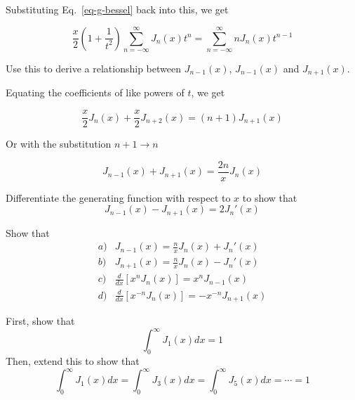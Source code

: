 Substituting Eq.~\ref{eq-g-bessel} back into this, we get

\begin{equation}
\frac{x}{2}\left({1 + \frac{1}{t^2}}\right) \sum_{n = - \infty}^{\infty} J_n(x)t^n = \sum_{n = - \infty}^{\infty} n J_n(x)t^{n-1}
\end{equation}

\begin{cue}
Use this to derive a relationship between $J_{n-1}(x)$, $J_{n-1}(x)$ and  $J_{n+1}(x)$. 
\end{cue}

\noindent{}Equating the coefficients of like powers of $t$, we get

\begin{equation}
\frac{x}{2} J_n(x) + \frac{x}{2} J_{n+2}(x) = (n+1)J_{n+1}(x)
\end{equation} 

Or with the substitution $n+1 \to n$

\begin{equation}
J_{n-1}(x) + J_{n+1}(x) = \frac{2n}{x} J_n(x)
\end{equation} 

\begin{exer}
Differentiate the generating function with respect to $x$ to show that
$$ J_{n-1}(x) - J_{n+1}(x) = 2 J_n'(x)$$ \label{ex-recur}
\end{exer}


\begin{exer}
Show that
$$\begin{array}{lcll}a) & J_{n-1}(x) = \frac{n}{x}J_n(x) + J_n'(x) \\b) & J_{n+1}(x) = \frac{n}{x}J_n(x) - J_n'(x) \\c) & \frac{d}{dx}\left[x^n J_n(x)\right] = x^n J_{n-1}(x) \\d) & \frac{d}{dx}\left[x^{-n} J_n(x)\right] = -x^{-n} J_{n+1}(x)\end{array}$$ \label{ex-recurrence}
\end{exer}

\pagebreak

\begin{exer}
First, show that
$$\int_0^\infty J_1( x) dx =  1$$
Then, extend this to show that
$$\int_0^\infty J_1( x) dx = \int_0^\infty J_3( x) dx = \int_0^\infty J_5( x) dx = \cdots = 1$$
\end{exer}

